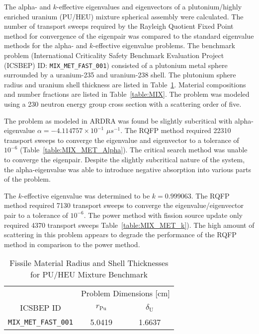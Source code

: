 The alpha- and $k$-effective eigenvalues and eigenvectors of a plutonium/highly enriched uranium (PU/HEU) mixture spherical assembly were calculated. The number of transport sweeps required by the Rayleigh Quotient Fixed Point method for convergence of the eigenpair was compared to the standard eigenvalue methods for the alpha- and $k$-effective eigenvalue problems. The benchmark problem (International Criticality Safety Benchmark Evaluation Project (ICSBEP) ID: \texttt{MIX\_MET\_FAST\_001}) consisted of a plutonium metal sphere surrounded by a uranium-235 and uranium-238 shell. The plutonium sphere radius and uranium shell thickness are listed in Table~\ref{table:MIX_MET_Dims}. Material compositions and number fractions are listed in Table~\ref{table:MIX}. The problem was modeled using a 230 neutron energy group cross section with a scattering order of five. 

The problem as modeled in ARDRA was found be slightly subcritical with alpha-eigen\-value $\alpha = -4.114757 \times 10^{-1}$ $\mu s^{-1}$. The RQFP method required 22310 transport sweeps to converge the eigenvalue and eigenvector to a tolerance of $10^{-6}$ (Table~\ref{table:MIX_MET_Alpha}). The critical search method was unable to converge the eigenpair. Despite the slightly subcritical nature of the system, the alpha-eigenvalue was able to introduce negative absorption into various parts of the problem.

The $k$-effective eigenvalue was determined to be $k = 0.999063$. The RQFP method required 7130 transport sweeps to converge the eigenvalue/eigenvector pair to a tolerance of $10^{-6}$. The power method with fission source update only required 4370 transport sweeps Table~\ref{table:MIX_MET_k}). The high amount of scattering in this problem appears to degrade the performance of the RQFP method in comparison to the power method.

\begin{table}[!htbp]
	\centering{}
	\begin{tabular}{@{}ccc@{}}\toprule
	& \multicolumn{2}{c}{Problem Dimensions [cm]} \\
	\cmidrule{2-3} ICSBEP ID & $r_{\text{Pu}}$ & $\delta_{\text{U}}$ \\
	\midrule
	\texttt{MIX\_MET\_FAST\_001} & 5.0419 & 1.6637 \\
	\bottomrule
	\end{tabular}
	\caption{Fissile Material Radius and Shell Thicknesses for PU/HEU Mixture Benchmark}
	\label{table:MIX_MET_Dims}
\end{table}


